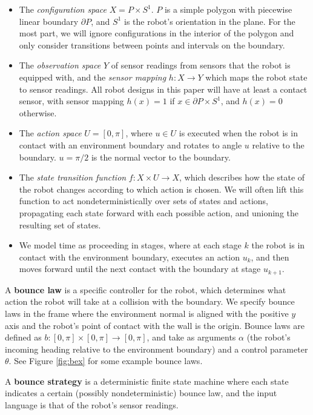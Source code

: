 \documentclass[]{styles/svproc}  %
\begin{document}
\begin{itemize}
\item The \emph{configuration space} $X = P \times S^1$. $P$ is a simple polygon with 
piecewise linear boundary $\partial P$, and $S^1$ is the robot's orientation in the plane. For the most part, we will ignore configurations in the interior
of the polygon and only consider transitions between points and intervals on the
boundary.
\item The \emph{observation space} $Y$ of sensor readings from sensors that the
robot is equipped with, and the \emph{sensor mapping} $h: X \to Y$ which maps
the robot state to sensor readings. All robot designs in this paper will have at
least a contact sensor, with sensor mapping $h(x) = 1$ if $x \in \partial
P \times S^1$, and $h(x) = 0$ otherwise.
\item The \emph{action space} $U = [0,\pi]$, where $u \in U$ is executed when
the robot is in contact with an environment boundary and rotates to angle $u$
relative to the boundary. $u = \pi/2$ is the normal vector to the boundary.
\item The \emph{state transition function} $f: X \times U \to X$, which
describes how the state of the robot changes according to which action is
chosen. We will often lift this function to act nondeterministically over sets
of states and actions, propagating each state forward with each possible action,
and unioning the resulting set of states.
\item We model time as proceeding in stages, where at each stage $k$ the robot
is in contact with the environment boundary, executes an action $u_k$, and then
moves forward until the next contact with the boundary at stage $u_{k+1}$.
\end{itemize}


\begin{definition}
A \textbf{bounce law} is a specific controller for the robot, which determines
what action the robot will take at a collision with the boundary.
We specify 
bounce laws in the
frame where the environment normal is aligned with the positive $y$ axis and the
robot's point of contact with the wall is the origin.  
Bounce laws are defined as $b: [0,\pi] \times [0,\pi] \to [0,\pi]$, and take as
arguments $\alpha$ (the robot's incoming heading relative to the environment
boundary) and a control parameter $\theta$. See Figure \ref{fig:bex} for some
example bounce laws. 
\end{definition}

\begin{definition}
A \textbf{bounce strategy} is a deterministic finite state machine where each
state indicates a certain (possibly nondeterministic) bounce law, and the input language is that of the
robot's sensor readings.
\end{definition}
\end{document}
